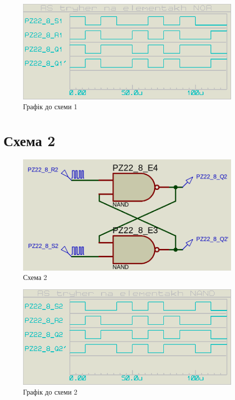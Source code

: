 \documentclass{article}
\begin{document}
\begin{normalsize}
	\begin{figure}[H]
		\centering
		\includegraphics[scale=0.25]{g1}	
		\caption{Графік до схеми 1}
	\end{figure}

	\section*{Схема 2}	
	\begin{figure}[H]
		\centering
		\includegraphics[scale=0.25]{s2}	
		\caption{Схема 2}
	\end{figure}
	
	\begin{figure}[H]
		\centering
		\includegraphics[scale=0.25]{g2}	
		\caption{Графік до схеми 2}
	\end{figure}


\end{normalsize}
\end{document}

